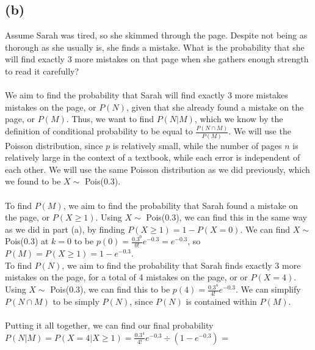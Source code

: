 \documentclass{article}
\begin{document}
{\subsection*{(b)}
Assume Sarah was tired, so she skimmed through the page. Despite not being as thorough as she usually is, she finds a mistake. What is the probability that she will find exactly 3 more mistakes on that page when she gathers enough strength to read it carefully? \\ \\
We aim to find the probability that Sarah will find exactly 3 more mistakes mistakes on the page, or $P(N)$, given that she already found a mistake on the page, or $P(M)$. Thus, we want to find $P(N | M)$, which we know by the definition of conditional probability to be equal to $\frac{P(N \cap M)}{P(M)}$. We will use the Poisson distribution, since $p$ is relatively small, while the number of pages $n$ is relatively large in the context of a textbook, while each error is independent of each other. We will use the same Poisson distribution as we did previously, which we found to be $X \sim $ Pois(0.3). \\ \\ 
To find $P(M)$, we aim to find the probability that Sarah found a mistake on the page, or $P(X \geq 1)$. Using $X \sim $ Pois(0.3), we can find this in the same way as we did in part (a), by finding $P(X \geq 1) = 1 - P(X = 0)$. We can find $X \sim $ Pois(0.3) at $k = 0$ to be $p(0) = \frac{0.3^0}{0!}e^{-0.3} = e^{-0.3}$, so $P(M) = P(X \geq 1) = 1 - e^{-0.3}$. \\ 
To find $P(N)$, we aim to find the probability that Sarah finds exactly 3 more mistakes on the page, for a total of 4 mistakes on the page, or or $P(X = 4)$. Using $X \sim $ Pois(0.3), we can find this to be $p(4) = \frac{0.3^4}{4!}e^{-0.3}$. We can simplify $P(N \cap M)$ to be simply $P(N)$, since $P(N)$ is contained within $P(M)$. \\ \\ 
Putting it all together, we can find our final probability $P(N | M) = P(X = 4 | X \geq 1) = \frac{0.3^4}{4!}e^{-0.3} \div (1 - e^{-0.3})$ = 

}
\end{document}
